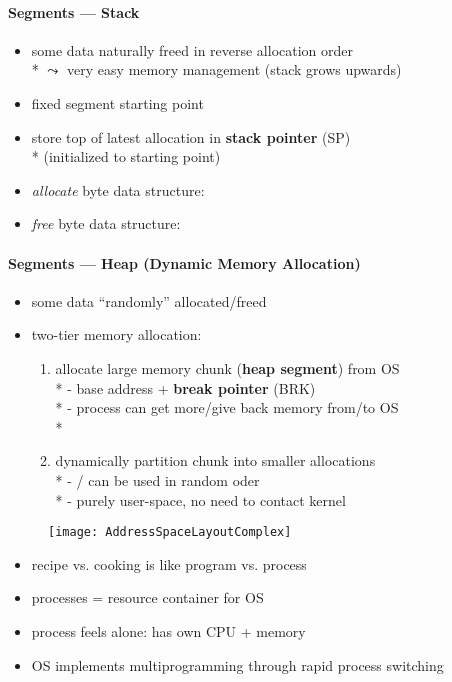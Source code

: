 \paragraph{Segments --- Stack}
\begin{itemize}
	\item some data naturally freed in reverse allocation order \\*
		\( \leadsto \) very easy memory management (stack grows upwards)
	\item fixed segment starting point
	\item store top of latest allocation in \textbf{stack pointer} (SP) \\*
		(initialized to starting point)
	\item \emph{allocate}  byte data structure: 
	\item \emph{free}  byte data structure: 
\end{itemize}

\paragraph{Segments --- Heap (Dynamic Memory Allocation)}
\begin{itemize}
	\item some data "`randomly"' allocated/freed
	\item two-tier memory allocation:
	\begin{enumerate}
		\item allocate large memory chunk (\textbf{heap segment}) from OS \\*
			- base address + \textbf{break pointer} (BRK) \\*
			- process can get more/give back memory from/to OS \\*
		\item dynamically partition chunk into smaller allocations \\*
			- / can be used in random oder \\*
			- purely user-space, no need to contact kernel
	\end{enumerate}
\end{itemize}

\begin{figure}[h]\centering\label{AddressSpaceLayoutComplex}\texttt{[image: AddressSpaceLayoutComplex]}\end{figure}

\begin{summary}
	\begin{itemize}
		\item recipe vs. cooking is like program vs. process
		\item processes = resource container for OS
		\item process feels alone: has own CPU + memory
		\item OS implements multiprogramming through rapid process switching
	\end{itemize}
\end{summary}